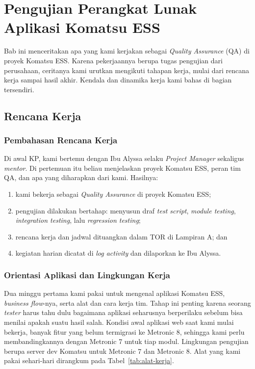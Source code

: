 \chapter{Pengujian Perangkat Lunak Aplikasi Komatsu ESS}

Bab ini menceritakan apa yang kami kerjakan sebagai \textit{Quality Assurance} (QA) di proyek Komatsu ESS. Karena pekerjaannya berupa tugas pengujian dari perusahaan, ceritanya kami urutkan mengikuti tahapan kerja, mulai dari rencana kerja sampai hasil akhir. Kendala dan dinamika kerja kami bahas di bagian tersendiri.

\section{Rencana Kerja}

\subsection{Pembahasan Rencana Kerja}
Di awal KP, kami bertemu dengan Ibu Alyssa selaku \textit{Project Manager} sekaligus \textit{mentor}. Di pertemuan itu beliau menjelaskan proyek Komatsu ESS, peran tim QA, dan apa yang diharapkan dari kami. Hasilnya:
\begin{enumerate}[label=\alph*)]
\item kami bekerja sebagai \textit{Quality Assurance} di proyek Komatsu ESS;
\item pengujian dilakukan bertahap: menyusun draf \textit{test script}, \textit{module testing}, \textit{integration testing}, lalu \textit{regression testing};
\item rencana kerja dan jadwal dituangkan dalam TOR di Lampiran A; dan
\item kegiatan harian dicatat di \textit{log activity} dan dilaporkan ke Ibu Alyssa.
\end{enumerate}

\subsection{Orientasi Aplikasi dan Lingkungan Kerja}
Dua minggu pertama kami pakai untuk mengenal aplikasi Komatsu ESS, \textit{business flow}-nya, serta alat dan cara kerja tim. Tahap ini penting karena seorang \textit{tester} harus tahu dulu bagaimana aplikasi seharusnya berperilaku sebelum bisa menilai apakah suatu hasil salah. Kondisi awal aplikasi web saat kami mulai bekerja, banyak fitur yang belum termigrasi ke Metronic 8, sehingga kami perlu membandingkannya dengan Metronic 7 untuk tiap modul. Lingkungan pengujian berupa server dev Komatsu untuk Metronic 7 dan Metronic 8. Alat yang kami pakai sehari-hari dirangkum pada Tabel~\ref{tab:alat-kerja}.

